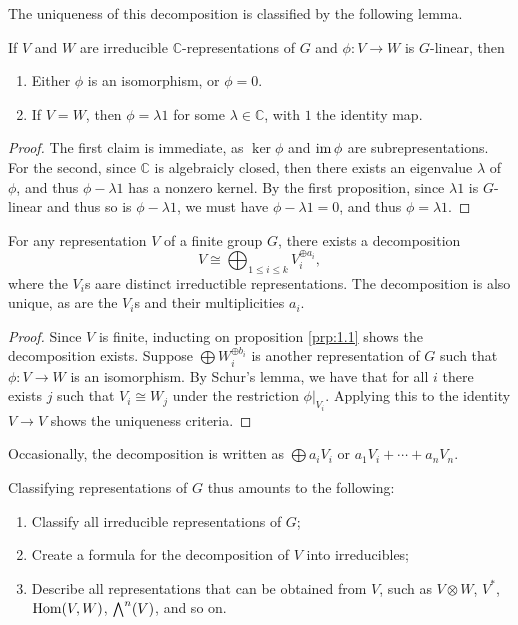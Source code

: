 The uniqueness of this decomposition is classified by the following lemma.
\begin{lemma}[Schur]\label{lma:1.1}
	If $V$ and $W$ are irreducible $\mathbb{C} $-representations of $G$ and $\phi : V \to W$ is $G$-linear, then
	\begin{enumerate}
		\item Either $\phi $ is an isomorphism, or $\phi =0$.
		\item If $V=W$, then $\phi =\lambda 1$ for some $\lambda \in\mathbb{C} $, with $1$ the identity map.
	\end{enumerate}
\end{lemma}
\begin{proof}
	The first claim is immediate, as $\ker \phi $ and $\operatorname{im} \phi $ are subrepresentations. For the second, since $\mathbb{C} $ is algebraicly closed, then there exists an eigenvalue $\lambda $ of $\phi $, and thus $\phi -\lambda 1$ has a nonzero kernel. By the first proposition, since $\lambda 1$ is $G$-linear and thus so is $\phi -\lambda 1$, we must have $\phi -\lambda 1=0$, and thus $\phi =\lambda 1$.
\end{proof}
\begin{proposition}\label{prp:1.2}
	For any representation $V$ of a finite group $G$, there exists a decomposition
	\[
		V\cong \bigoplus_{1\leq i\leq k} V_i^{\oplus a_i} 
	,\]
	where the $V_i$s aare distinct irreductible representations. The decomposition is also unique, as are the $V_i$s and their multiplicities $a_i$.
\end{proposition}
\begin{proof}
	Since $V$ is finite, inducting on proposition \ref{prp:1.1} shows the decomposition exists. Suppose $\bigoplus W_i^{\oplus b_i} $ is another representation of $G$ such that $\phi : V \to W$ is an isomorphism. By Schur's lemma, we have that for all $i$ there exists $j$ such that $V_i\cong W_j$ under the restriction $\phi|_{V_i} $. Applying this to the identity $V\to V$  shows the uniqueness criteria.
\end{proof}
Occasionally, the decomposition is written as $\bigoplus a_i V_i$ or $a_1V_i + \cdots + a_n V_n$.

Classifying representations of $G$ thus amounts to the following:
\begin{enumerate}
	\item Classify all irreducible representations of $G$;
	\item Create a formula for the decomposition of $V$ into irreducibles;
	\item Describe all representations that can be obtained from $V$, such as $V\otimes W$, $V^*$, $\operatorname{Hom}(V, W) $, $\mathbin{\textstyle\bigwedge}^{n}(V) $, and so on.
\end{enumerate}
